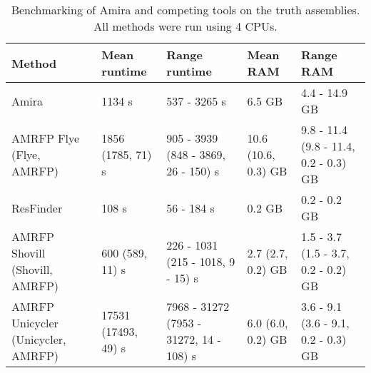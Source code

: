 \begin{sidewaystable}[ht]
\centering
\caption{Benchmarking of Amira and competing tools on the truth assemblies. All methods were run using 4 CPUs.}
\begin{tabular}{|l|l|l|l|l|}
\hline
\textbf{Method} & \textbf{Mean runtime} & \textbf{Range runtime} & \textbf{Mean RAM} & \textbf{Range RAM} \\ \hline
Amira & 1134 s & 537 - 3265 s & 6.5 GB & 4.4 - 14.9 GB \\ \hline
AMRFP Flye (Flye, AMRFP) & 1856 (1785, 71) s & 905 - 3939 (848 - 3869, 26 - 150) s & 10.6 (10.6, 0.3) GB & 9.8 - 11.4 (9.8 - 11.4, 0.2 - 0.3) GB \\ \hline
ResFinder & 108 s & 56 - 184 s & 0.2 GB & 0.2 - 0.2 GB \\ \hline
AMRFP Shovill (Shovill, AMRFP) & 600 (589, 11) s & 226 - 1031 (215 - 1018, 9 - 15) s & 2.7 (2.7, 0.2) GB & 1.5 - 3.7 (1.5 - 3.7, 0.2 - 0.2) GB \\ \hline
AMRFP Unicycler (Unicycler, AMRFP) & 17531 (17493, 49) s & 7968 - 31272 (7953 - 31272, 14 - 108) s & 6.0 (6.0, 0.2) GB & 3.6 - 9.1 (3.6 - 9.1, 0.2 - 0.3) GB \\ \hline
\end{tabular}
\label{supptable:2}
\end{sidewaystable}
